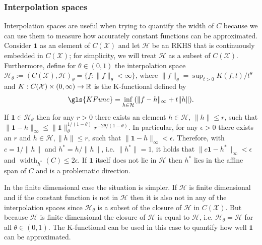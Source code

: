 \documentclass[10pt]{amsart}
\theoremstyle{definition}\newtheorem{defi}[theo]{Definition}\newtheorem{rema}[theo]{Remark}\newtheorem{exam}[theo]{Example}\newtheorem{exem}[theo]{Example}\newtheorem{nota}[theo]{Notation}
\theoremstyle{remark}
\DeclareMathOperator{\diame}{width}
\newcommand{\R}{\mathbb{R}}
\newcommand{\X}{\mathcal{X}}
\newcommand{\cH}{\mathcal{H}}
\renewcommand*{\to}{\mathchoice{\longrightarrow}{\rightarrow}{\rightarrow}{\rightarrow}}
\begin{document}
\subsubsection{Interpolation spaces} \label{sec:interpol}
Interpolation spaces are useful when trying to quantify the width of $C$ because we can use them to measure how accurately constant functions can be approximated. Consider $\bm 1$ as an element of $C(\X)$ and let $\cH$ be an RKHS that is continuously embedded in $C(\X)$; for simplicity, we will treat $\cH$ as a subset of $C(\X)$. Furthermore, define for $\theta \in (0,1)$ the interpolation space $\cH_\theta:= (C(\X),\cH)_\theta = \{f : \|f\|_\theta < \infty \}$, where $\|f\|_{\theta} = \sup_{t > 0} K(f,t)/t^\theta$ and $K:C(\X) \times (0,\infty)\to \R$ is the K-functional defined by
\[
\gls{KFunc} = \inf_{h\in \cH}(\|f- h\|_\infty + t \|h\|).
\]
If $\bm 1 \in \cH_\theta$ then for any $r>0$ there exists an element $h\in \cH$, $\|h\| \leq r$, such that $\|\bm 1 - h\|_{\infty} \leq \|\bm 1\|_\theta^{1/(1-\theta)} r^{-2\theta/(1-\theta)}$. In particular, for any $\epsilon >0$ there exists an $r$ and $h\in\cH, \|h\|\leq r$, such that $\|\bm 1 - h\|_\infty < \epsilon$. Therefore, with $c = 1/\|h\|$ and $h^* = h/\|h\|$, i.e. $\|h^*\|=1$, it holds that $\|c \bm 1 - h^*\|_\infty < \epsilon$ and $\diame_{h^*}(C) \leq 2 \epsilon$. If $\bm 1$ itself does not lie in $\cH$ then $h^*$ lies in the affine span of $C$ and is a problematic direction.

In the finite dimensional case the situation is simpler. If $\cH$ is finite dimensional and if the constant function is not in $\cH$ then it is also not in any of the interpolation spaces since $\cH_\theta$ is a subset of the closure of $\cH$ in $C(\X)$. But because $\cH$ is finite dimensional the closure of $\cH$ is equal to $\cH$, i.e. $\cH_\theta = \cH$ for all $\theta \in (0,1)$. The K-functional can be used in this case to quantify how well $\bm 1$ can be approximated.
\end{document}
